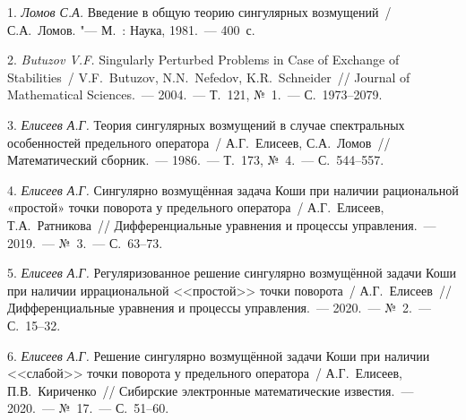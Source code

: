 
\litlist

1. {\it Ломов С.А.} Введение в общую теорию сингулярных возмущений~/ С.А.~Ломов. "--- М.~: Наука, 1981.~--- 400~с.

2. {\it Butuzov V.F.} Singularly Perturbed Problems in Case of Exchange of Stabilities~/ V.F.~Butuzov, N.N.~Nefedov, K.R.~Schneider~// Journal of Mathematical Sciences.~--- 2004.~--- Т.~121, №~1.~--- С.~1973--2079.

3. {\it Елисеев А.Г.} Теория сингулярных возмущений в случае спектральных особенностей предельного оператора~/ А.Г.~Елисеев, \linebreak С.А.~Ломов~// Математический сборник.~--- 1986.~--- Т.~173, №~4.~--- С.~544--557.

4. {\it Елисеев А.Г.} Сингулярно возмущённая задача Коши при наличии рациональной «простой» точки поворота у предельного оператора~/ А.Г.~Елисеев, Т.А.~Ратникова~// Дифференциальные уравнения и процессы управления.~--- 2019.~--- №~3.~--- С.~63--73.

5. {\it Елисеев А.Г.} Регуляризованное решение сингулярно возмущённой задачи Коши при наличии иррациональной <<простой>> точки поворота~/ А.Г.~Елисеев~// Дифференциальные уравнения и процессы управления.~--- 2020.~--- №~2.~--- С.~15--32.

6. {\it Елисеев А.Г.} Решение сингулярно возмущённой задачи Коши при наличии <<слабой>> точки поворота у предельного оператора~/ А.Г.~Елисеев, П.В.~Кириченко~// Сибирские электронные математические известия.~--- 2020.~--- №~17.~--- С.~51--60.
